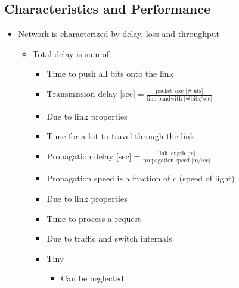 \subsection{Characteristics and Performance}
\begin{itemize}
    \item Network is characterized by delay, loss and throughput
        \begin{itemize}
            \item Total delay is sum of:
                \begin{itemize}
                        \begin{itemize}
                            \item Time to push all bits onto the link
                            \item $\text{Transmission delay [sec]} = \frac{\text{packet size [\# bits]}}{\text{line bandwith [\# bits/sec]}}$
                            \item Due to link properties
                        \end{itemize}
                        \begin{itemize}
                            \item Time for a bit to travel through the link
                            \item $\text{Propagation delay [sec]} = \frac{\text{link length [m]}}{\text{propagation speed [m/sec]}}$
                            \item Propagation speed is a fraction of $c$ (speed of light)
                            \item Due to link properties
                        \end{itemize}
                        \begin{itemize}
                            \item Time to process a request
                            \item Due to traffic and switch internals
                            \item Tiny
                                \begin{itemize}
                                    \item Can be neglected
                                \end{itemize}
                        \end{itemize}

\end{itemize}
\end{itemize}
\end{itemize}

